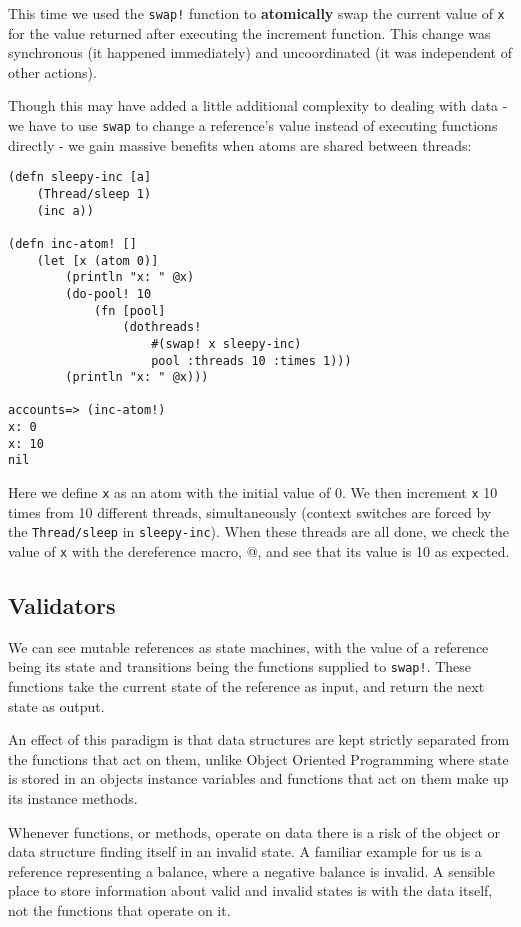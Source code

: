 \documentclass[a4paper,12pt]{kth-mag}
\begin{document}
This time we used the \texttt{swap!} function to \textbf{atomically} swap the current value of \texttt{x} for the value returned after executing the increment function. This change was synchronous (it happened immediately) and uncoordinated (it was independent of other actions).

Though this may have added a little additional complexity to dealing with data - we have to use \texttt{swap} to change a reference's value instead of executing functions directly - we gain massive benefits when atoms are shared between threads:

\begin{listing}[H]
	\begin{verbatim}
(defn sleepy-inc [a]
    (Thread/sleep 1)
    (inc a))

(defn inc-atom! []
    (let [x (atom 0)]
        (println "x: " @x)
        (do-pool! 10
            (fn [pool]
                (dothreads! 
                    #(swap! x sleepy-inc) 
                    pool :threads 10 :times 1)))
        (println "x: " @x)))
        
accounts=> (inc-atom!)
x: 0
x: 10
nil
	\end{verbatim}
\end{listing}

Here we define \texttt{x} as an atom with the initial value of 0. We then increment \texttt{x} 10 times from 10 different threads, simultaneously (context switches are forced by the \texttt{Thread/sleep} in \texttt{sleepy-inc}). When these threads are all done, we check the value of \texttt{x} with the dereference macro, @, and see that its value is 10 as expected.

\subsection{Validators}

We can see mutable references as state machines, with the value of a reference being its state and transitions being the functions supplied to \texttt{swap!}. These functions take the current state of the reference as input, and return the next state as output. 

An effect of this paradigm is that data structures are kept strictly separated from the functions that act on them, unlike Object Oriented Programming where state is stored in an objects instance variables and functions that act on them make up its instance methods.

Whenever functions, or methods, operate on data there is a risk of the object or data structure finding itself in an invalid state. A familiar example for us is a reference representing a balance, where a negative balance is invalid. A sensible place to store information about valid and invalid states is with the data itself, not the functions that operate on it.
\end{document}
